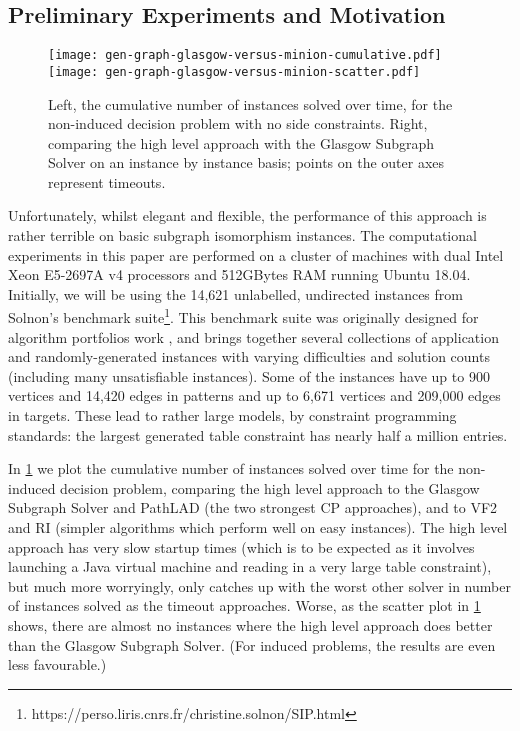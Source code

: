 \documentclass[runningheads]{llncs}
\begin{document}
\subsection{Preliminary Experiments and Motivation}

\begin{figure}[tb]
\texttt{[image: gen-graph-glasgow-versus-minion-cumulative.pdf]}\hfill\texttt{[image: gen-graph-glasgow-versus-minion-scatter.pdf]}

    \caption{Left, the cumulative number of instances solved over time, for the non-induced decision
    problem with no side constraints. Right, comparing the high level approach with the Glasgow
    Subgraph Solver on an instance by instance basis; points on the outer axes represent
    timeouts.}\label{figure:solvers}
\end{figure}

Unfortunately, whilst elegant and flexible, the performance of this approach is rather terrible on
basic subgraph isomorphism instances.  The computational experiments in this paper are performed on
a cluster of machines with dual Intel Xeon E5-2697A v4 processors and 512GBytes RAM running Ubuntu
18.04.  Initially, we will be using the 14,621 unlabelled, undirected instances from Solnon's
benchmark suite\footnote{https://perso.liris.cnrs.fr/christine.solnon/SIP.html}. This benchmark
suite was originally designed for algorithm portfolios work \cite{DBLP:conf/lion/KotthoffMS16}, and
brings together several collections of application and randomly-generated instances with varying
difficulties and solution counts (including many unsatisfiable instances). Some of the instances
have up to 900 vertices and 14,420 edges in patterns and up to 6,671 vertices and 209,000 edges in
targets. These lead to rather large models, by constraint programming standards: the largest
generated table constraint has nearly half a million entries.

In \cref{figure:solvers} we plot the cumulative number of instances solved over time for the
non-induced decision problem, comparing the high level approach to the Glasgow Subgraph Solver
\cite{DBLP:conf/gg/McCreeshP020} and PathLAD \cite{DBLP:conf/lion/KotthoffMS16} (the two strongest
CP approaches), and to VF2 \cite{DBLP:journals/pami/CordellaFSV04} and RI
\cite{DBLP:journals/bmcbi/BonniciGPSF13} (simpler algorithms which perform well on easy instances).
The high level approach has very slow startup times (which is to be expected as it involves
launching a Java virtual machine and reading in a very large table constraint), but much more
worryingly, only catches up with the worst other solver in number of instances solved as the timeout
approaches. Worse, as the scatter plot in \cref{figure:solvers} shows, there are almost no instances
where the high level approach does better than the Glasgow Subgraph Solver. (For induced problems,
the results are even less favourable.)
\end{document}
